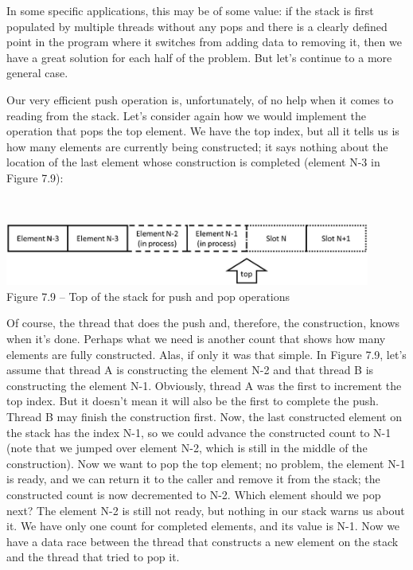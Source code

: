 In some specific applications, this may be of some value: if the stack is first populated by multiple threads without any pops and there is a clearly defined point in the program where it switches from adding data to removing it, then we have a great solution for each half of the problem. But let's continue to a more general case.

Our very efficient push operation is, unfortunately, of no help when it comes to reading from the stack. Let's consider again how we would implement the operation that pops the top element. We have the top index, but all it tells us is how many elements are currently being constructed; it says nothing about the location of the last element whose construction is completed (element N-3 in Figure 7.9):

\hspace*{\fill} \\ %
\begin{center}
\includegraphics[width=0.9\textwidth]{content/2/chapter7/images/9.jpg}\\
Figure 7.9 – Top of the stack for push and pop operations
\end{center}

Of course, the thread that does the push and, therefore, the construction, knows when it's done. Perhaps what we need is another count that shows how many elements are fully constructed. Alas, if only it was that simple. In Figure 7.9, let's assume that thread A is constructing the element N-2 and that thread B is constructing the element N-1. Obviously, thread A was the first to increment the top index. But it doesn't mean it will also be the first to complete the push. Thread B may finish the construction first. Now, the last constructed element on the stack has the index N-1, so we could advance the constructed count to N-1 (note that we jumped over element N-2, which is still in the middle of the construction). Now we want to pop the top element; no problem, the element N-1 is ready, and we can return it to the caller and remove it from the stack; the constructed count is now decremented to N-2. Which element should we pop next? The element N-2 is still not ready, but nothing in our stack warns us about it. We have only one count for completed elements, and its value is N-1. Now we have a data race between the thread that constructs a new element on the stack and the thread that tried to pop it.

